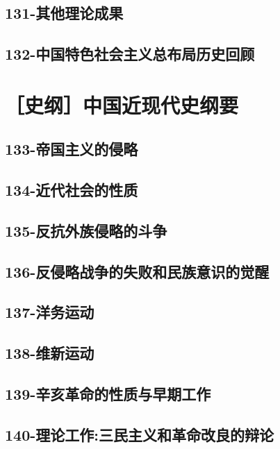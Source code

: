 \subsection{131-其他理论成果}

\subsection{132-中国特色社会主义总布局历史回顾}



\section{［史纲］中国近现代史纲要}


\subsection{133-帝国主义的侵略}

\subsection{134-近代社会的性质}

\subsection{135-反抗外族侵略的斗争}

\subsection{136-反侵略战争的失败和民族意识的觉醒}

\subsection{137-洋务运动}

\subsection{138-维新运动}

\subsection{139-辛亥革命的性质与早期工作}

\subsection{140-理论工作:三民主义和革命改良的辩论}

